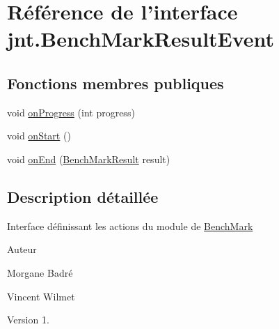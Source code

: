\hypertarget{interfacejnt_1_1BenchMarkResultEvent}{\section{Référence de l'interface jnt.\-Bench\-Mark\-Result\-Event}
\label{interfacejnt_1_1BenchMarkResultEvent}
}
\subsection*{Fonctions membres publiques}
\begin{DoxyCompactItemize}
\item 
void \hyperlink{interfacejnt_1_1BenchMarkResultEvent_a7c2652a118e989cf3c8dbe7a9ad41d45}{on\-Progress} (int progress)
\item 
void \hyperlink{interfacejnt_1_1BenchMarkResultEvent_a2fdb77769ccd049e4c1e9baf17cb881f}{on\-Start} ()
\item 
void \hyperlink{interfacejnt_1_1BenchMarkResultEvent_a326de44d27feacaf59c72fa28e96eab8}{on\-End} (\hyperlink{classjnt_1_1BenchMarkResult}{Bench\-Mark\-Result} result)
\end{DoxyCompactItemize}


\subsection{Description détaillée}
Interface définissant les actions du module de \hyperlink{classjnt_1_1BenchMark}{Bench\-Mark} \begin{DoxyAuthor}{Auteur}

\begin{DoxyItemize}
\item Morgane Badré 
\item Vincent Wilmet 
\end{DoxyItemize}
\end{DoxyAuthor}
\begin{DoxyVersion}{Version}
1. 
\end{DoxyVersion}


